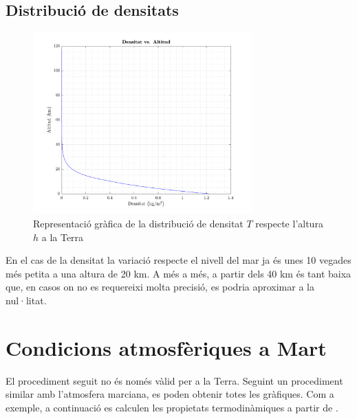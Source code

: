 \clearpage
\subsection{Distribució de densitats}
\begin{figure}[ht]
    \centering
    \includegraphics[width=0.75\textwidth]{imagenes/03_grafiques_general/density_earth.pdf}
    \caption{Representació gràfica de la distribució de densitat $T$ respecte l'altura $h$ a la Terra}
    \label{fig:density_earth}
\end{figure}

En el cas de la densitat la variació respecte el nivell del mar ja és unes 10 vegades més petita a una altura de 20 km. A més a més, a partir dels 40 km és tant baixa que, en casos on no es requereixi molta precisió, es podria aproximar a la nul·litat. 

\newpage
\section{Condicions atmosfèriques a Mart}

El procediment seguit no és només vàlid per a la Terra. Seguint un procediment similar amb l'atmosfera marciana, es poden obtenir totes les gràfiques. Com a exemple, a continuació es calculen les propietats termodinàmiques a partir de \cite{nasa_mars_sheet}.

